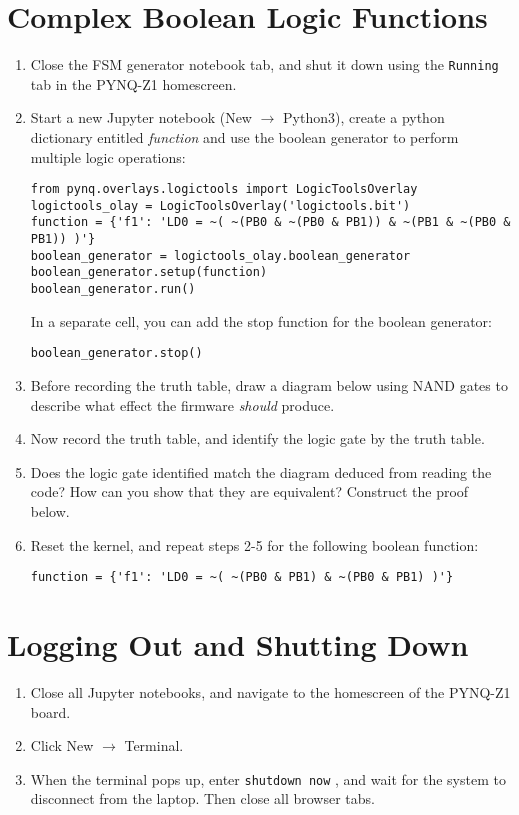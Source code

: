 \documentclass{article}
\begin{document}
\section{Complex Boolean Logic Functions}

\begin{enumerate}
\item Close the FSM generator notebook tab, and shut it down using the \verb+Running+ tab in the PYNQ-Z1 homescreen.
\item Start a new Jupyter notebook (New $\rightarrow$ Python3), create a python dictionary entitled \textit{function} and use the boolean generator to perform multiple logic operations:
\begin{verbatim}
from pynq.overlays.logictools import LogicToolsOverlay
logictools_olay = LogicToolsOverlay('logictools.bit')
function = {'f1': 'LD0 = ~( ~(PB0 & ~(PB0 & PB1)) & ~(PB1 & ~(PB0 & PB1)) )'}
boolean_generator = logictools_olay.boolean_generator
boolean_generator.setup(function)
boolean_generator.run()
\end{verbatim}
In a separate cell, you can add the stop function for the boolean generator:
\begin{verbatim}
boolean_generator.stop()
\end{verbatim}
\item Before recording the truth table, draw a diagram below using NAND gates to describe what effect the firmware \textit{should} produce. \\ \vspace{1cm}
\item Now record the truth table, and identify the logic gate by the truth table. \\ \vspace{1cm}
\item Does the logic gate identified match the diagram deduced from reading the code?  How can you show that they are equivalent? Construct the proof below. \\ \vspace{2cm}
\item Reset the kernel, and repeat steps 2-5 for the following boolean function:
\begin{verbatim}
function = {'f1': 'LD0 = ~( ~(PB0 & PB1) & ~(PB0 & PB1) )'}
\end{verbatim}
\vspace{5cm}
\end{enumerate}

\section{Logging Out and Shutting Down}

\begin{enumerate}
\item Close all Jupyter notebooks, and navigate to the homescreen of the PYNQ-Z1 board.
\item Click New $\rightarrow$ Terminal.
\item When the terminal pops up, enter \verb+shutdown now+ , and wait for the system to disconnect from the laptop.  Then close all browser tabs.
\end{enumerate}
\end{document}

